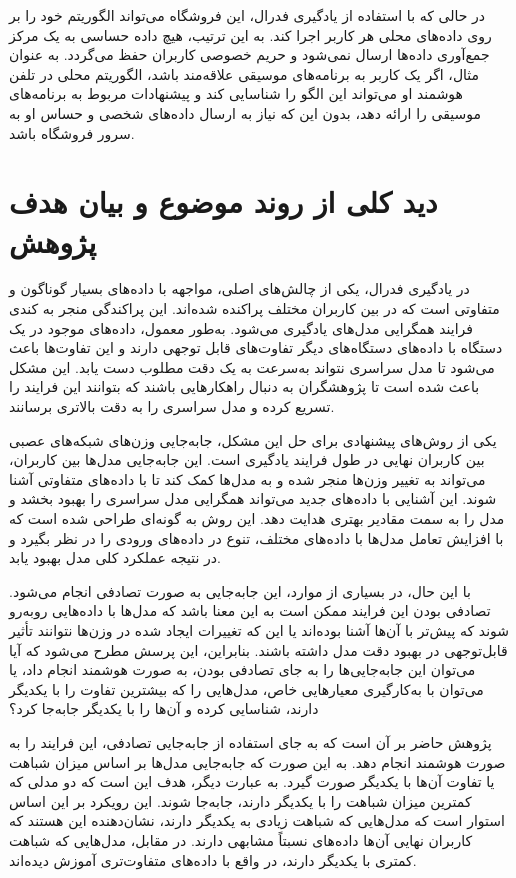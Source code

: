 در حالی که با استفاده از یادگیری فدرال، این فروشگاه می‌تواند الگوریتم خود را بر روی داده‌های محلی هر کاربر اجرا کند. به این ترتیب، هیچ داده حساسی به یک مرکز جمع‌آوری داده‌ها ارسال نمی‌شود و حریم خصوصی کاربران حفظ می‌گردد. به عنوان مثال، اگر یک کاربر به برنامه‌های موسیقی علاقه‌مند باشد، الگوریتم محلی در تلفن هوشمند او می‌تواند این الگو را شناسایی کند و پیشنهادات مربوط به برنامه‌های موسیقی را ارائه دهد، بدون این که نیاز به ارسال داده‌های شخصی و حساس او به سرور فروشگاه باشد.


\section{دید کلی از روند موضوع و بیان هدف پژوهش}

در یادگیری فدرال، یکی از چالش‌های اصلی، مواجهه با داده‌های بسیار گوناگون و متفاوتی است که در بین کاربران مختلف پراکنده شده‌اند. این پراکندگی منجر به کندی فرایند همگرایی مدل‌های یادگیری می‌شود. به‌طور معمول، داده‌های موجود در یک دستگاه با داده‌های دستگاه‌های دیگر تفاوت‌های قابل توجهی دارند و این تفاوت‌ها باعث می‌شود تا مدل سراسری نتواند به‌سرعت به یک دقت مطلوب دست یابد. این مشکل باعث شده است تا پژوهشگران به دنبال راهکارهایی باشند که بتوانند این فرایند را تسریع کرده و مدل سراسری را به دقت بالاتری برسانند.

یکی از روش‌های پیشنهادی برای حل این مشکل، جابه‌جایی وزن‌های شبکه‌های عصبی بین کاربران نهایی در طول فرایند یادگیری است. این جابه‌جایی مدل‌ها بین کاربران، می‌تواند به تغییر وزن‌ها منجر شده و به مدل‌ها کمک کند تا با داده‌های متفاوتی آشنا شوند. این آشنایی با داده‌های جدید می‌تواند همگرایی مدل سراسری را بهبود بخشد و مدل را به سمت مقادیر بهتری هدایت دهد. این روش به گونه‌ای طراحی شده است که با افزایش تعامل مدل‌ها با داده‌های مختلف، تنوع در داده‌های ورودی را در نظر بگیرد و در نتیجه عملکرد کلی مدل بهبود یابد.

با این حال، در بسیاری از موارد، این جابه‌جایی به صورت تصادفی انجام می‌شود. تصادفی بودن این فرایند ممکن است به این معنا باشد که مدل‌ها با داده‌هایی روبه‌رو شوند که پیش‌تر با آن‌ها آشنا بوده‌اند یا این که تغییرات ایجاد شده در وزن‌ها نتوانند تأثیر قابل‌توجهی در بهبود دقت مدل داشته باشند. بنابراین، این پرسش مطرح می‌شود که آیا می‌توان این جابه‌جایی‌ها را به جای تصادفی بودن، به صورت هوشمند انجام داد، یا می‌توان با به‌کارگیری معیارهایی خاص، مدل‌هایی را که بیشترین تفاوت را با یکدیگر دارند، شناسایی کرده و آن‌ها را با یکدیگر جابه‌جا کرد؟

پژوهش حاضر بر آن است که به جای استفاده از جابه‌جایی تصادفی، این فرایند را به صورت هوشمند انجام دهد. به این صورت که جابه‌جایی مدل‌ها بر اساس میزان شباهت یا تفاوت آن‌ها با یکدیگر صورت گیرد. به عبارت دیگر، هدف این است که دو مدلی که کمترین میزان شباهت را با یکدیگر دارند، جابه‌جا شوند. این رویکرد بر این اساس استوار است که مدل‌هایی که شباهت زیادی به یکدیگر دارند، نشان‌دهنده این هستند که کاربران نهایی آن‌ها داده‌های نسبتاً مشابهی دارند. در مقابل، مدل‌هایی که شباهت کمتری با یکدیگر دارند، در واقع با داده‌های متفاوت‌تری آموزش دیده‌اند.

